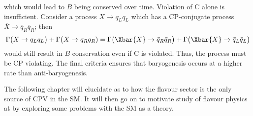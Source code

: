 which would lead to $B$ being conserved over time.
Violation of C alone is insufficient.
Consider a process $X\to q_Lq_L$ which has a CP-conjugate process $\bar X\to \bar q_R\bar q_R$;
then
\begin{equation}
  \Gamma\big(X\to q_Lq_L\big) + \Gamma\big(X\to q_Rq_R)
  =
  \Gamma\big(\Xbar{X}\to \bar q_R\bar q_R\big) + \Gamma\big(\Xbar{X}\to \bar q_L\bar q_L\big)
\end{equation}
would still result in $B$ conservation even if C is violated.
Thus, the process must be CP violating.
The final criteria ensures that baryogenesis occurs at a higher rate than anti-baryogenesis.

The following chapter will elucidate as to how the flavour sector is the only source of CPV in the
SM.
It will then go on to motivate study of flavour physics at \lhcb by exploring some problems with
the SM as a theory.






